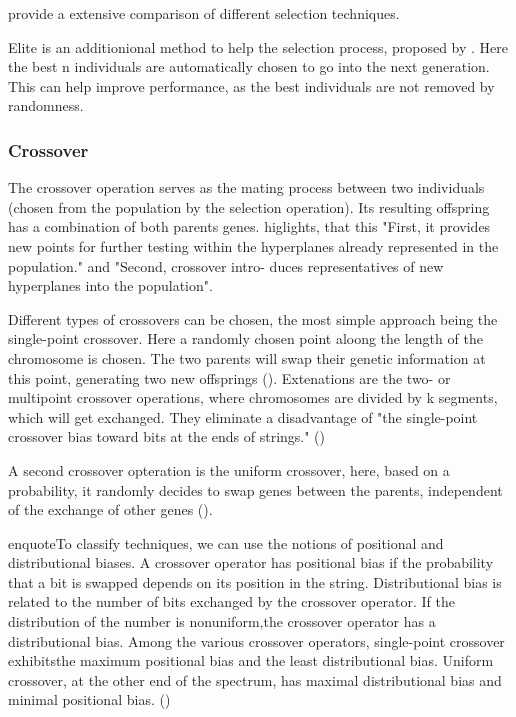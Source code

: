 \cite{hussain_trade-off_2020} provide a extensive comparison of different selection techniques.

Elite is an additionional method to help the selection process, proposed by \cite{de_jong_analysis_1975}. Here the best n individuals are automatically chosen to go into the next generation. This can help improve performance, as the best individuals are not removed by randomness.


\subsubsection{Crossover}
The crossover operation serves as the mating process between two individuals (chosen from the population by the selection operation). Its resulting offspring has a combination of both parents genes. \cite{grefenstette_optimization_1986} higlights, that this "First, it provides new points for further testing within the hyperplanes already represented in the population." and "Second, crossover intro- duces representatives of new hyperplanes into the population". 

Different types of crossovers can be chosen, the most simple approach being the single-point crossover. Here a randomly chosen point aloong the length of the chromosome is chosen. The two parents will swap their genetic information at this point, generating two new offsprings (\cite{katoch_review_2021}). Extenations are the two- or multipoint crossover operations, where chromosomes are divided by k segments, which will get exchanged. They eliminate a disadvantage of "the single-point crossover bias toward bits at the ends of strings." (\cite{srinivas_genetic_1994})

A second crossover opteration is the uniform crossover, here, based on a probability, it randomly decides to swap genes between the parents, independent of the exchange of other genes (\cite{katoch_review_2021}). 

enquote{To classify techniques, we can use the notions of positional and distributional biases. A crossover operator has positional bias if the probability that a bit is swapped depends on its position in the string. Distributional bias is related to the number of bits exchanged by the crossover operator. If the distribution of the number is nonuniform,the crossover operator has a distributional bias. Among the various crossover operators, single-point crossover exhibitsthe maximum positional bias and the least distributional bias. Uniform crossover, at the other end of the spectrum, has maximal distributional bias and minimal positional bias.} (\cite{srinivas_genetic_1994})

